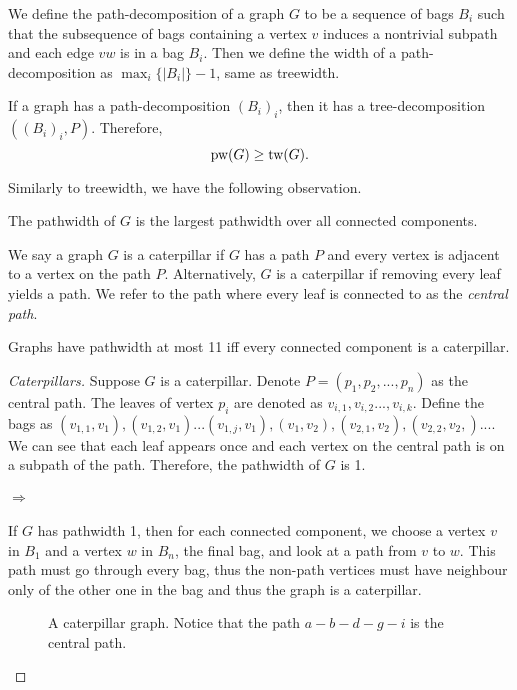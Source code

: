 We define the path-decomposition of a graph $G$ to be a sequence of bags $B_i$ such that the subsequence of bags containing a vertex $v$ induces a nontrivial subpath and each edge $vw$ is in a bag $B_i$. Then we define the width of a path-decomposition as $\max_i \lbrace |B_i| \rbrace -1$, same as treewidth.

If a graph has a path-decomposition $(B_i)_i$, then it has a tree-decomposition $\left((B_i)_i, P\right)$. Therefore,
\begin{equation}
	\text{pw}(G) \geq \text{tw}(G).
\end{equation}

Similarly to treewidth, we have the following observation.
\begin{lemma}
	The pathwidth of $G$ is the largest pathwidth over all connected components.
\end{lemma}
We say a graph $G$ is a caterpillar if $G$ has a path $P$ and every vertex is adjacent to a vertex on the path $P$. Alternatively, $G$ is a caterpillar if removing every leaf yields a path. We refer to the path where every leaf is connected to as the \textit{central path}.
\begin{theorem}[Caterpillars]
	Graphs have pathwidth at most 11 iff every connected component is a caterpillar.
\end{theorem}
\begin{proof}[Caterpillars]
	Suppose $G$ is a caterpillar. Denote $P =\left( p_1, p_2, ..., p_n\right)$ as the central path. The leaves of vertex $p_i$ are denoted as $v_{i, 1}, v_{i, 2} ..., v_{i, k}$. Define the bags as $(v_{1, 1}, v_1), (v_{1, 2}, v_1)... (v_{1, j}, v_1), (v_1, v_2), (v_{2, 1}, v_2), (v_{2,2}, v_2,)... $. We can see that each leaf appears once and each vertex on the central path is on a subpath of the path. Therefore, the pathwidth of $G$ is 1.
	\paragraph{$\Rightarrow$}
	If $G$ has pathwidth 1, then for each connected component, we choose a vertex $v$ in $B_1$ and a vertex $w$ in $B_n$, the final bag, and look at a path from $v$ to $w$. This path must go through every bag, thus the non-path vertices must have neighbour only of the other one in the bag and thus the graph is a caterpillar. 
	
	\begin{figure}[h]
		\centering
		
		\caption{A caterpillar graph. Notice that the path $a - b - d - g - i$ is the central path.}
		\label{fig:caterpillar}
	\end{figure}
\end{proof}


